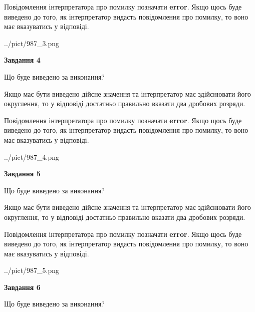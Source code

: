 \documentclass[12pt, ukrainian]{article}
\begin{document}
{\begin {Large}
Повідомлення інтерпретатора про помилку позначати \textbf{error}.
Якщо щось буде виведено до того, як інтерпретатор видасть повідомлення про помилку, 
то воно має вказуватись у відповіді. \par

\begin{center}
	{../pict/987_3.png}
\end{center}
\newpage

{\begin {center}\textbf{Завдання 4}\end {center}}\par
Що буде виведено за виконання? \par

Якщо має бути виведено дійсне значення та інтерпретатор має здійснювати його округлення, 
то у відповіді достатньо правильно вказати два дробових розряди.

Повідомлення інтерпретатора про помилку позначати \textbf{error}.
Якщо щось буде виведено до того, як інтерпретатор видасть повідомлення про помилку, 
то воно має вказуватись у відповіді. \par

\begin{center}
	{../pict/987_4.png}
\end{center}
\newpage

{\begin {center}\textbf{Завдання 5}\end {center}}\par
Що буде виведено за виконання? \par

Якщо має бути виведено дійсне значення та інтерпретатор має здійснювати його округлення, 
то у відповіді достатньо правильно вказати два дробових розряди.

Повідомлення інтерпретатора про помилку позначати \textbf{error}.
Якщо щось буде виведено до того, як інтерпретатор видасть повідомлення про помилку, 
то воно має вказуватись у відповіді. \par

\begin{center}
	{../pict/987_5.png}
\end{center}
\newpage

{\begin {center}\textbf{Завдання 6}\end {center}}\par
Що буде виведено за виконання? \par


\end{Large}}
\end{document}
